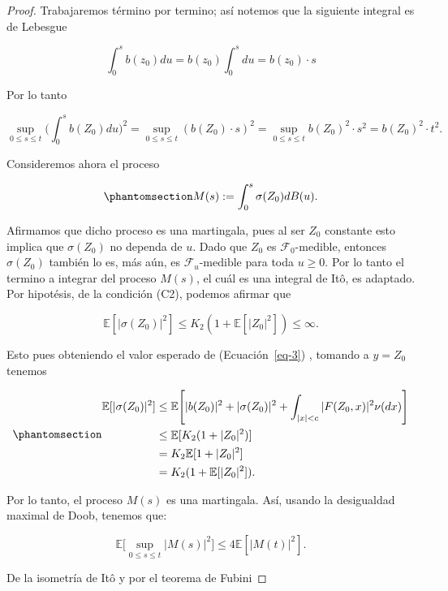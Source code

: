 \documentclass[
  spanish,
  us-letterpaper,
]{scrreprt}
\theoremstyle{plain}
\theoremstyle{plain}
\theoremstyle{plain}
\theoremstyle{definition}
\theoremstyle{remark}
\begin{document}
\begin{proof}
Trabajaremos término por termino; así notemos que la siguiente integral
es de Lebesgue

\[
    \int_0^s b(z_0)du = b(z_0) \int_0^s du = b(z_0)\cdot s
\]

Por lo tanto

\[
    \sup\limits_{0\leq s\leq t}\Bigg(\int_0^s b(Z_0)du\Bigg)^2=\sup\limits_{0\leq s\leq t}(b(Z_0)\cdot s)^2=\sup\limits_{0\leq s\leq t} b(Z_0)^2\cdot s^2= b(Z_0)^2\cdot t^2.
\]

Consideremos ahora el proceso

\begin{equation}\phantomsection\label{eq-mart}{
    M(s):=\int_0^s \sigma(Z_0)dB(u).
}\end{equation}

Afirmamos que dicho proceso es una martingala, pues al ser \(Z_0\)
constante esto implica que \(\sigma(Z_0)\) no dependa de \(u\). Dado que
\(Z_0\) es \(\mathcal{F}_0\text{-medible}\), entonces \(\sigma(Z_0)\)
también lo es, más aún, es \(\mathcal{F}_u\text{-medible}\) para toda
\(u\geq 0\). Por lo tanto el termino a integrar del proceso \(M(s)\), el
cuál es una integral de Itô, es adaptado. Por hipotésis, de la condición
(C2), podemos afirmar que

\[
        \mathbb{E}[|\sigma(Z_0)|^2] \leq K_2(1+\mathbb{E}[|Z_0|^2])\leq \infty.
\]

Esto pues obteniendo el valor esperado de (Ecuación~\ref{eq-3}) ,
tomando a \(y=Z_0\) tenemos

\begin{equation}\phantomsection\label{eq-6}{
    \begin{aligned}
        \mathbb{E}[|\sigma(Z_0)|^2] & \leq \mathbb{E}\Bigg[|b(Z_0)|^2+|\sigma(Z_0)|^2+\int_{|x|<c} |F(Z_0,x)|^2 \nu(dx)\Bigg]\\ 
        & \leq \mathbb{E}[K_2(1+|Z_0|^2)]\\ 
        & = K_2\mathbb{E}[1+|Z_0|^2]\\ 
        & = K_2 (1+\mathbb{E}[|Z_0|^2]).
    \end{aligned}
}\end{equation}

Por lo tanto, el proceso \(M(s)\) es una martingala. Así, usando la
desigualdad maximal de Doob, tenemos que:

\[
    \mathbb{E}\Bigg[\sup\limits_{0\leq s\leq t}|M(s)|^2\Bigg]\leq 4\mathbb{E}[|M(t)|^2].
\]

De la isometría de Itô y por el teorema de Fubini


\end{proof}
\end{document}
